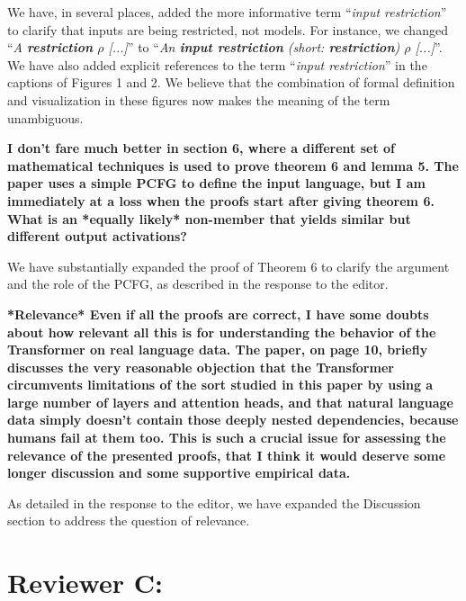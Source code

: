 \documentclass[11pt,a4paper]{article}
\newcounter{theorem}
\newcommand{\key}[1]{\textbf{#1}}
\newcommand\response[1]{{\color{blue}#1}}
\newcommand\newtext[1]{``\textit{#1}''}
\newcommand\original[1]{\textbf{#1}}
\begin{document}
\response{We have, in several places, added the more informative term \newtext{input restriction} to clarify that inputs are being restricted, not models. For instance, we changed \newtext{A \key{restriction} $\rho$ [...]} to \newtext{An \key{input restriction} (short: \key{restriction}) $\rho$ [...]}. We have also added explicit references to the term \newtext{input restriction} in the captions of Figures 1 and 2. We believe that the combination of formal definition and visualization in these figures now makes the meaning of the term unambiguous.}

\original{I don’t fare much better in section 6, where a different set of
mathematical techniques is used to prove theorem 6 and lemma 5. The paper
uses a simple PCFG to define the input language, but I am immediately at a
loss when the proofs start after giving theorem 6. What is an *equally
likely* non-member that yields similar but different output activations?}

\response{We have substantially expanded the proof of Theorem 6 to clarify the argument and the role of the PCFG, as described in the response to the editor.}

\original{*Relevance*
Even if all the proofs are correct, I have some doubts about how relevant
all this is for understanding the behavior of the Transformer on real
language data. The paper, on page 10, briefly discusses the very reasonable
objection that the Transformer circumvents limitations of the sort studied
in this paper by using a large number of layers and attention heads, and
that natural language data simply doesn’t contain those deeply nested
dependencies, because humans fail at them too. This is such a crucial issue
for assessing the relevance of the presented proofs, that I think it would
deserve some longer discussion and some supportive empirical data.}

\response{As detailed in the response to the editor, we have expanded the Discussion section to address the question of relevance.}


\section{Reviewer C:}
\end{document}
